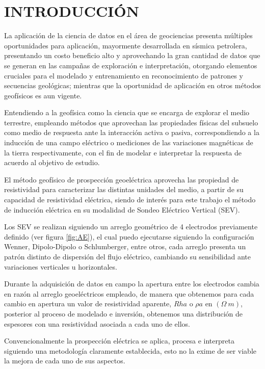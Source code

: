 \chapter{INTRODUCCIÓN}

La aplicación de la ciencia de datos en el área de geociencias presenta múltiples oportunidades para aplicación, mayormente desarrollada en sísmica petrolera, presentando un costo beneficio alto y aprovechando la gran cantidad de datos que se generan en las campañas de exploración e interpretación, otorgando elementos cruciales para el modelado y entrenamiento en reconocimiento de patrones y secuencias geológicas; mientras que la oportunidad de aplicación en otros métodos geofísicos es aun vigente. 

Entendiendo a la geofísica como la ciencia que se encarga de explorar el medio terrestre, empleando métodos que aprovechan las propiedades físicas del subsuelo como medio de respuesta ante la interacción activa o pasiva, correspondiendo a la inducción de una campo eléctrico o mediciones de las variaciones magnéticas de la tierra respectivamente, con el fin de modelar e interpretar la respuesta de acuerdo al objetivo de estudio. 

El método geofísico de prospección geoeléctrica aprovecha las propiedad de resistividad para caracterizar las distintas unidades del medio, a partir de su capacidad de resistividad eléctrica, siendo de interés para este trabajo el método de inducción eléctrica en su modalidad de Sondeo Eléctrico Vertical (SEV).

Los SEV se realizan siguiendo un arreglo geométrico de 4 electrodos previamente definido (ver figura \ref{fig:AE}), el cual puedo ejecutarse siguiendo la configuración Wenner, Dipolo-Dipolo o Schlumberger, entre otros, cada arreglo presenta un patrón distinto de dispersión del flujo eléctrico, cambiando su sensibilidad ante variaciones verticales u horizontales. 

Durante la adquisición de datos en campo la apertura entre los electrodos cambia en razón al arreglo geoeléctricos empleado, de manera que obtenemos para cada cambio en apertura un valor de resistividad aparente, $Rha$ o $\rho a$ en $(\varOmega\ m)$, posterior al proceso de modelado e inversión, obtenemos una distribución de espesores con una resistividad asociada a cada uno de ellos.

Convencionalmente la prospección eléctrica se aplica, procesa e interpreta siguiendo una metodología claramente establecida, esto no la exime de ser viable la mejora de cada uno de sus aspectos.

